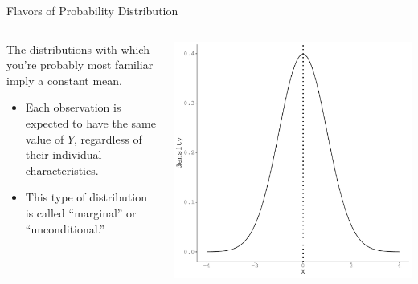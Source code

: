 \documentclass[10pt]{beamer}\usepackage[]{graphicx}\usepackage[]{color}
\makeatletter
\def\maxwidth{ %
  \ifdim\Gin@nat@width>\linewidth
    \linewidth
  \else
    \Gin@nat@width
  \fi
}
\newenvironment{knitrout}{}{} %
\makeatother
\begin{document}
\begin{frame}{Flavors of Probability Distribution}

  \begin{columns}
    \begin{column}{0.5\textwidth}
      The distributions with which you're probably most familiar imply a
      constant mean.
      \vb
      \begin{itemize}
      \item Each observation is expected to have the same value of $Y$,
        regardless of their individual characteristics.
        \vb
      \item This type of distribution is called ``marginal'' or ``unconditional.''
      \end{itemize}
    \end{column}

    \begin{column}{0.5\textwidth}

\begin{knitrout}\footnotesize
{}\color{fgcolor}

{\centering \includegraphics[width=\maxwidth]{figure/unnamed-chunk-1-1} 

}


\end{knitrout}

\end{column}
\end{columns}

\end{frame}
\end{document}
